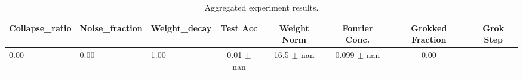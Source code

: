 \begin{table}[t]
\centering
\begin{tabular}{lll | c c c c c}
\toprule
Collapse\_ratio & Noise\_fraction & Weight\_decay & Test Acc & Weight Norm & Fourier Conc. & Grokked Fraction & Grok Step \\
\midrule
0.00 & 0.00 & 1.00 & 0.01 $\pm$ nan & 16.5 $\pm$ nan & 0.099 $\pm$ nan & 0.00 & - \\
\bottomrule
\end{tabular}
\caption{Aggregated experiment results.}
\label{tab:aggregated_results}
\end{table}